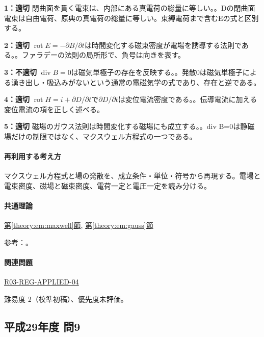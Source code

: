 \noindent\textbf{1：適切} 閉曲面を貫く電束は、内部にある真電荷の総量に等しい。。Dの閉曲面電束は自由電荷、原典の真電荷の総量に等しい。束縛電荷まで含むEの式と区別する。\par

\noindent\textbf{2：適切} \(\operatorname{rot}E=-\partial B/\partial t\)は時間変化する磁束密度が電場を誘導する法則である。。ファラデーの法則の局所形で、負号は向きを表す。\par

\noindent\textbf{3：不適切} \(\operatorname{div}B=0\)は磁気単極子の存在を反映する。。発散0は磁気単極子による湧き出し・吸込みがないという通常の電磁気学の式であり、存在と逆である。\par

\noindent\textbf{4：適切} \(\operatorname{rot}H=i+\partial D/\partial t\)で\(\partial D/\partial t\)は変位電流密度である。。伝導電流に加える変位電流の項を正しく述べる。\par

\noindent\textbf{5：適切} 磁場のガウス法則は時間変化する磁場にも成立する。。div B=\allowbreak{}0は静磁場だけの制限ではなく、マクスウェル方程式の一つである。\par

\paragraph{再利用する考え方} マクスウェル方程式と場の発散を、成立条件・単位・符号から再現する。電場と電束密度、磁場と磁束密度、電荷一定と電圧一定を読み分ける。

\paragraph{共通理論} \hyperref[theory:em:maxwell]{第\ref*{theory:em:maxwell}節}, \hyperref[theory:em:gauss]{第\ref*{theory:em:gauss}節}

\par 参考：\cite{mit_em13}。

\paragraph{関連問題} \hyperref[q:r03-reg-applied-04]{R03-REG-APPLIED-04}

\par 難易度 2（校準初稿）、優先度未評価。

\subsection{平成29年度 問9}
\label{q:h29-reg-applied-09}

